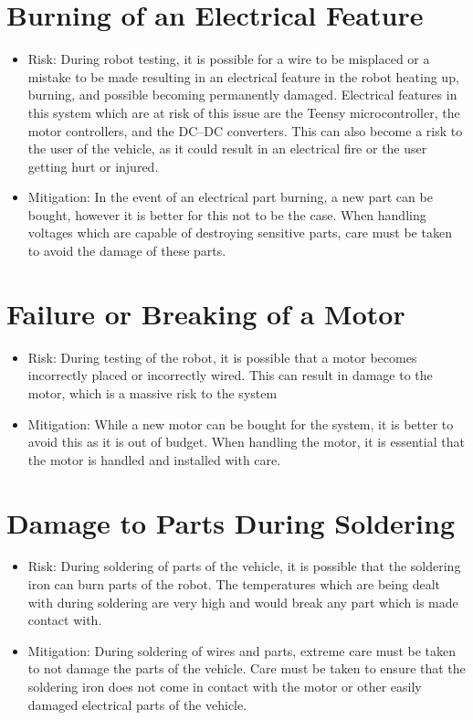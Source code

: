 \documentclass[11pt]{report}
\begin{document}
\section{Burning of an Electrical Feature}
\begin{itemize}
    \item Risk: During robot testing, it is possible for a wire to be misplaced or a mistake to be made resulting in an electrical feature in the robot heating up, burning, and possible becoming permanently damaged. Electrical features in this system which are at risk of this issue are the Teensy microcontroller, the motor controllers, and the \gls{DC}--\gls{DC} converters. This can also become a risk to the user of the vehicle, as it could result in an electrical fire or the user getting hurt or injured.
    \item Mitigation: In the event of an electrical part burning, a new part can be bought, however it is better for this not to be the case. When handling voltages which are capable of destroying sensitive parts, care must be taken to avoid the damage of these parts. 
\end{itemize}
\section{Failure or Breaking of a Motor} 
\begin{itemize}
    \item Risk: During testing of the robot, it is possible that a motor becomes incorrectly placed or incorrectly wired. This can result in damage to the motor, which is a massive risk to the system
    \item Mitigation: While a new motor can be bought for the system, it is better to avoid this as it is out of budget. When handling the motor, it is essential that the motor is handled and installed with care. 
\end{itemize}
\section{Damage to Parts During Soldering}
\begin{itemize}
    \item Risk: During soldering of parts of the vehicle, it is possible that the soldering iron can burn parts of the robot. The temperatures which are being dealt with during soldering are very high and would break any part which is made contact with. 
    \item Mitigation: During soldering of wires and parts, extreme care must be taken to not damage the parts of the vehicle. Care must be taken to ensure that the soldering iron does not come in contact with the motor or other easily damaged electrical parts of the vehicle.
\end{itemize}
\end{document}
